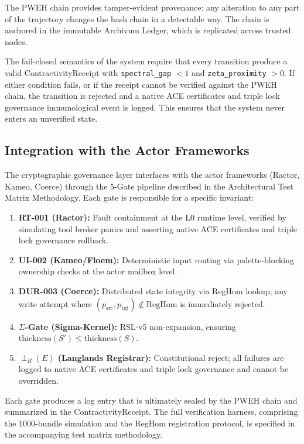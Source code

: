 \documentclass[12pt]{article}
\theoremstyle{plain}
\theoremstyle{definition}
\theoremstyle{remark}
\begin{document}
The PWEH chain provides tamper-evident provenance: any alteration to any part of the trajectory changes the hash chain in a detectable way. The chain is anchored in the immutable Archivum Ledger, which is replicated across trusted nodes.

The fail-closed semantics of the system require that every transition produce a valid ContractivityReceipt with \texttt{spectral\_gap} $< 1$ and \texttt{zeta\_proximity} $> 0$. If either condition fails, or if the receipt cannot be verified against the PWEH chain, the transition is rejected and a native ACE certificates and triple lock governance immunological event is logged. This ensures that the system never enters an unverified state.

\subsection{Integration with the Actor Frameworks}

The cryptographic governance layer interfaces with the actor frameworks (Ractor, Kameo, Coerce) through the 5-Gate pipeline described in the Architectural Test Matrix Methodology. Each gate is responsible for a specific invariant:

\begin{enumerate}
    \item \textbf{RT-001 (Ractor):} Fault containment at the L0 runtime level, verified by simulating tool broker panics and asserting native ACE certificates and triple lock governance rollback.
    \item \textbf{UI-002 (Kameo/Floem):} Deterministic input routing via palette-blocking ownership checks at the actor mailbox level.
    \item \textbf{DUR-003 (Coerce):} Distributed state integrity via RegHom lookup; any write attempt where $(p_{\text{src}}, p_{\text{tgt}}) \notin \text{RegHom}$ is immediately rejected.
    \item \textbf{$\Sigma$-Gate (Sigma-Kernel):} RSL-v5 non-expansion, ensuring $\text{thickness}(S') \leq \text{thickness}(S)$.
    \item \textbf{$\perp_R(E)$ (Langlands Registrar):} Constitutional reject; all failures are logged to native ACE certificates and triple lock governance and cannot be overridden.
\end{enumerate}

Each gate produces a log entry that is ultimately sealed by the PWEH chain and summarized in the ContractivityReceipt. The full verification harness, comprising the 1000-bundle simulation and the RegHom registration protocol, is specified in the accompanying test matrix methodology.
\end{document}
